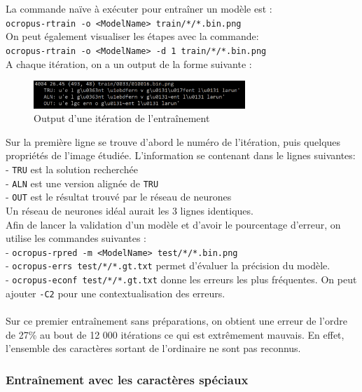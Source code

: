 \documentclass{article}
\begin{document}
La commande naïve à exécuter pour entraîner un modèle est : \\
\texttt{ocropus-rtrain -o <ModelName> train/*/*.bin.png} \\
On peut également visualiser les étapes avec la commande: \\
\texttt{ocropus-rtrain -o <ModelName> -d 1 train/*/*.bin.png} \\

\noindent A chaque itération, on a un output de la forme suivante : 

\begin{figure}[!h] 
    \center
    \includegraphics[width=8cm]{screen_output.png}
    \caption{Output d'une itération de l'entraînement}
    \label{API}
\end{figure}

Sur la première ligne se trouve d'abord le numéro de l'itération, puis quelques propriétés de l'image étudiée. L'information se contenant dans le lignes suivantes: \\
- \texttt{TRU} est la solution recherchée \\
- \texttt{ALN} est une version alignée de \texttt{TRU} \\
- \texttt{OUT} est le résultat trouvé par le réseau de neurones \\
Un réseau de neurones idéal aurait les 3 lignes identiques. \\

Afin de lancer la validation d'un modèle et d'avoir le pourcentage d'erreur, on utilise les commandes suivantes : \\
- \texttt{ocropus-rpred -m <ModelName> test/*/*.bin.png} \\
- \texttt{ocropus-errs test/*/*.gt.txt} permet d'évaluer la précision du modèle. \\
- \texttt{ocropus-econf test/*/*.gt.txt} donne les erreurs les plus fréquentes.
On peut ajouter \texttt{-C2} pour une contextualisation des erreurs. \\
\\
Sur ce premier entraînement sans préparations, on obtient une erreur de l'ordre de 27\% au bout de 12 000 itérations ce qui est extrêmement mauvais. En effet, l'ensemble des caractères sortant de l'ordinaire ne sont pas reconnus.


\subsubsection{Entraînement avec les caractères spéciaux}
\end{document}
